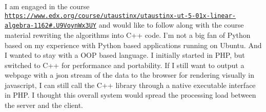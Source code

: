 I am engaged in the course \href{https://www.edx.org/course/utaustinx/utaustinx-ut-5-01x-linear-algebra-1162#.U9VoynWx3UY}{\tt https\-://www.\-edx.\-org/course/utaustinx/utaustinx-\/ut-\/5-\/01x-\/linear-\/algebra-\/1162\#.\-U9\-Voyn\-Wx3\-U\-Y} and would like to follow along with the course material rewriting the algorithms into C++ code. I'm not a big fan of Python based on my experience with Python based applications running on Ubuntu. And I wanted to stay with a O\-O\-P based language. I initially started in P\-H\-P, but switched to C++ for performance and portability. If I still want to output a webpage with a json stream of the data to the browser for rendering visually in javascript, I can still call the C++ library through a native executable interface in P\-H\-P. I thought this overall system would spread the processing load between the server and the client. 
